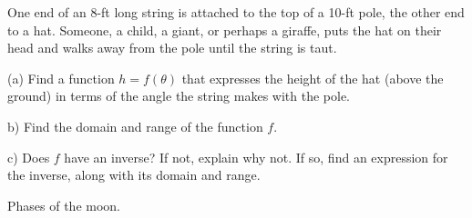 \documentclass{ximera}
\begin{document}
\begin{question}  \label{Qtgb677432}
One end of an 8-ft long string is attached to the top of a 10-ft pole, the other end to a hat. Someone, a child, a giant, or perhaps a giraffe, puts the hat on their head and walks away from the pole until the string is taut.

(a) Find a function $h=f(\theta)$ that expresses the height of the hat (above the ground) in terms of the angle the string makes with the pole.

b) Find the domain and range of the function $f$.

c) Does $f$ have an inverse? If not, explain why not. If so, find an expression for the inverse, along with its domain and range.
\end{question}




\begin{question} \label{Q8:RightTriangle}
Phases of the moon.

\begin{exploration}

 
\begin{onlineOnly}
    \begin{center}
\end{center}
\end{onlineOnly}
\end{exploration}

\end{question}
\end{document}
